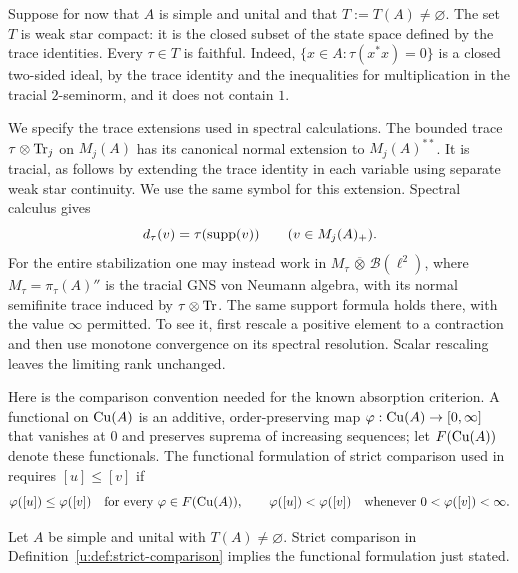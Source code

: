 Suppose for now that $A$ is simple and unital and that
$T:=T(A)\ne\varnothing$. The set $T$ is weak star compact: it is the
closed subset of the state space defined by the trace identities.
Every $\tau\in T$ is faithful. Indeed,
$\{x\in A:\tau(x^*x)=0\}$ is a closed two-sided ideal, by the trace
identity and the inequalities for multiplication in the tracial
$2$-seminorm, and it does not contain $1$.

We specify the trace extensions used in spectral calculations. The
bounded trace $\tau\otimes\operatorname{Tr}_j$ on $M_j(A)$ has its canonical normal
extension to $M_j(A)^{**}$. It is tracial, as follows by extending the
trace identity in each variable using separate weak star continuity.
We use the same symbol for this extension. Spectral calculus gives
\[
 d_\tau(v)=\tau(\operatorname{supp}(v))\qquad(v\in M_j(A)_+).
\]
For the entire stabilization one may instead work in
$M_\tau\,\overline\otimes\,\mathcal B(\ell^2)$, where
$M_\tau=\pi_\tau(A)''$ is the tracial GNS von Neumann algebra, with
its normal semifinite trace induced by $\tau\otimes\operatorname{Tr}$. The same
support formula holds there, with the value $\infty$ permitted. To
see it, first rescale a positive element to a contraction and then
use monotone convergence on its spectral resolution. Scalar
rescaling leaves the limiting rank unchanged.

Here is the comparison convention needed for the known absorption
criterion. A functional on $\operatorname{Cu}(A)$ is an additive, order-preserving
map $\varphi:\operatorname{Cu}(A)\to[0,\infty]$ that vanishes at $0$ and preserves
suprema of increasing sequences; let $F(\operatorname{Cu}(A))$ denote these
functionals. The functional formulation of strict comparison used
in \cite[Section~5, pp.~20--21 of the arXiv version]{CETW} requires
$[u]\le[v]$ if
\[
 \varphi([u])\le\varphi([v])\quad\text{for every }
 \varphi\in F(\operatorname{Cu}(A)),
 \qquad
 \varphi([u])<\varphi([v])\quad\text{whenever }
 0<\varphi([v])<\infty.
\]

\begin{lemma}
\label{u:lem:comparison-convention}
Let $A$ be simple and unital with $T(A)\ne\varnothing$. Strict
comparison in Definition~\ref{u:def:strict-comparison} implies the
functional formulation just stated.
\end{lemma}

